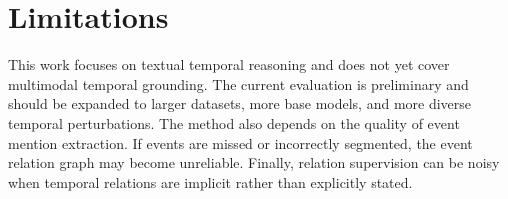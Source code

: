 \documentclass[11pt]{article}
\begin{document}
\section*{Limitations}

This work focuses on textual temporal reasoning and does not yet cover multimodal temporal grounding. The current evaluation is preliminary and should be expanded to larger datasets, more base models, and more diverse temporal perturbations. The method also depends on the quality of event mention extraction. If events are missed or incorrectly segmented, the event relation graph may become unreliable. Finally, relation supervision can be noisy when temporal relations are implicit rather than explicitly stated.


\end{document}
